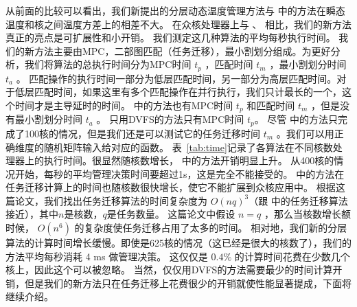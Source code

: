  从前面的比较可以看出，我们新提出的分层动态温度管理方法与 \cite{MaWang:APCCAS'14}中的方法在瞬态温度和核之间温度方差上的相差不大。
 在众核处理器上与 \cite{MaWang:APCCAS'14}、 \cite{Hanumaiah:TCAD'11}相比，我们的新方法真正的亮点是可扩展性和小开销。
 我们测定这几种算法的平均每秒执行时间。
 我们的新方法主要由MPC，二部图匹配（任务迁移），最小割划分组成。为更好分析，我们将算法的总执行时间分为MPC时间 $t_p$ ，匹配时间 $t_m$ ，最小割划分时间 $t_a$ 。
 匹配操作的执行时间一部分为低层匹配时间，另一部分为高层匹配时间。对于低层匹配时间，如果这里有多个匹配操作在并行执行，我们只计最长的一个，这个时间才是主导延时的时间。
 \cite{MaWang:APCCAS'14} 中的方法也有MPC时间 $t_p$ 和匹配时间 $t_m$ ，但是没有最小割划分时间 $t_a$ 。
 只用DVFS的方法只有MPC时间 $t_p$。
 尽管 \cite{Hanumaiah:TCAD'11} 中的方法只完成了100核的情况，但是我们还是可以测试它的任务迁移时间 $t_m$ 。我们可以用正确维度的随机矩阵输入给对应的函数。
 表~\ref{tab:time}记录了各算法在不同核数处理器上的执行时间。很显然随核数增长， \cite{MaWang:APCCAS'14} 中的方法开销明显上升。
 从400核的情况开始，每秒的平均管理决策时间要超过1s，这是完全不能接受的。
 \cite{Hanumaiah:TCAD'11} 中的方法在任务迁移计算上的时间也随核数很快增长，使它不能扩展到众核应用中。
 根据这篇论文，我们找出任务迁移算法的时间复杂度为 $O(nq)^3$（跟 \cite{MaWang:APCCAS'14} 中的任务迁移算法接近），其中$n$是核数，$q$是任务数量。
 这篇论文中假设 $n=q$ ，那么当核数增长额时候， $O(n^6)$ 的复杂度使任务迁移占用了太多的时间。
 相对地，我们新的分层算法的计算时间增长缓慢。即使是625核的情况（这已经是很大的核数了），我们的方法平均每秒消耗 4 ms 做管理决策。
 这仅仅是 $0.4\%$ 的计算时间花费在少数几个核上，因此这个可以被忽略。
 当然，仅仅用DVFS的方法需要最少的时间计算开销，但是我们的新方法只在任务迁移上花费很少的开销就使性能显著提成，下面将继续介绍。
 
